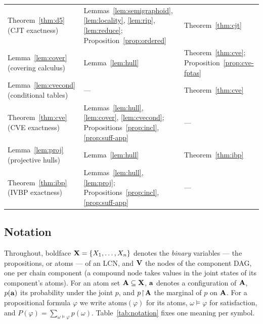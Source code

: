 \documentclass{article} %
\newcommand{\atoms}{\mathrm{atoms}}
\newcommand{\restr}{\!\restriction\!}
\begin{document}
\begin{table}[h]
\begin{tabularx}{\linewidth}{@{}l X X@{}}
Theorem~\ref{thm:d5} (CJT exactness) & Lemmas~\ref{lem:semigraphoid}, \ref{lem:locality}, \ref{lem:rip}, \ref{lem:reduce}; Proposition~\ref{prop:ordered} & Theorem~\ref{thm:cjt}\\
Lemma~\ref{lem:cover} (covering calculus) & Lemma~\ref{lem:hull} & Theorem~\ref{thm:cve}; Proposition~\ref{prop:cve-fptas}\\
Lemma~\ref{lem:cvecond} (conditional tables) & --- & Theorem~\ref{thm:cve}\\
Theorem~\ref{thm:cve} (CVE exactness) & Lemmas~\ref{lem:hull}, \ref{lem:cover}, \ref{lem:cvecond}; Propositions~\ref{prop:incl}, \ref{prop:suff-app} & ---\\
Lemma~\ref{lem:proj} (projective hulls) & Lemma~\ref{lem:hull} & Theorem~\ref{thm:ibp}\\
Theorem~\ref{thm:ibp} (IVBP exactness) & Lemmas~\ref{lem:hull}, \ref{lem:proj}; Propositions~\ref{prop:incl}, \ref{prop:suff-app} & ---\\
\bottomrule
\end{tabularx}
\end{table}

\subsection{Notation}\label{sec:prelim-notation}
Throughout, boldface $\mathbf{X}=\{X_1,\dots,X_n\}$ denotes the \emph{binary}
variables --- the propositions, or atoms --- of an LCN, and $\mathbf{V}$ the nodes of
the component DAG, one per chain component (a compound node takes values in the
joint states of its component's atoms). For an atom set $\mathbf{A}\subseteq\mathbf{X}$,
$\mathbf{a}$ denotes a configuration of $\mathbf{A}$, $p(\mathbf{a})$ its probability under the
joint $p$, and $p\restr\bA$ the marginal of $p$ on $\mathbf{A}$. For a propositional
formula $\varphi$ we write $\atoms(\varphi)$ for its atoms,
$\omega\models\varphi$ for satisfaction, and $P(\varphi)=\sum_{\omega\models\varphi}p(\omega)$.
Table~\ref{tab:notation} fixes one meaning per symbol.
\end{document}
